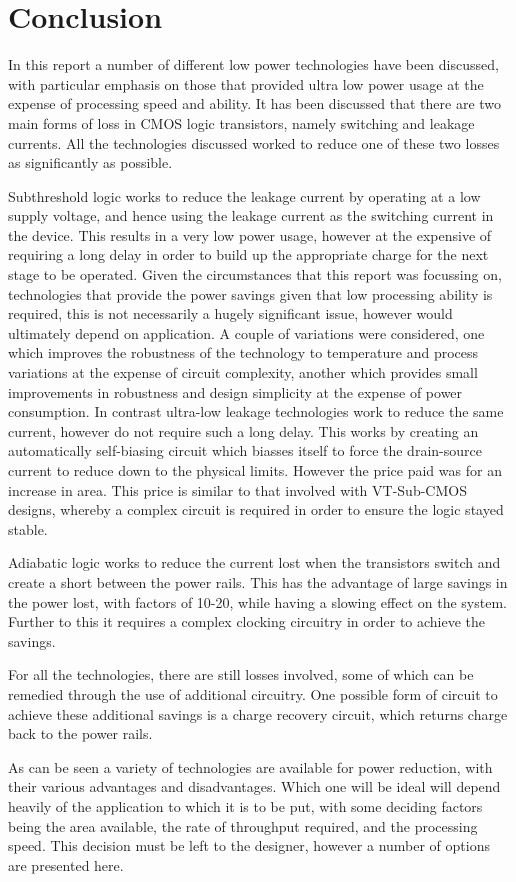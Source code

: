 \section{Conclusion}

In this report a number of different low power technologies have been discussed, with particular emphasis on those that provided ultra low power usage at the expense of processing speed and ability.
It has been discussed that there are two main forms of loss in CMOS logic transistors, namely switching and leakage currents.
All the technologies discussed worked to reduce one of these two losses as significantly as possible. 

Subthreshold logic works to reduce the leakage current by operating at a low supply voltage, and hence using the leakage current as the switching current in the device.
This results in a very low power usage, however at the expensive of requiring a long delay in order to build up the appropriate charge for the next stage to be operated.
Given the circumstances that this report was focussing on, technologies that provide the power savings given that low processing ability is required, this is not necessarily a hugely significant issue, however would ultimately depend on application.
A couple of variations were considered, one which improves the robustness of the technology to temperature and process variations at the expense of circuit complexity, another which provides small improvements in robustness and design simplicity at the expense of power consumption.
In contrast ultra-low leakage technologies work to reduce the same current, however do not require such a long delay.
This works by creating an automatically self-biasing circuit which biasses itself to force the drain-source current to reduce down to the physical limits.
However the price paid was for an increase in area.
This price is similar to that involved with VT-Sub-CMOS designs, whereby a complex circuit is required in order to ensure the logic stayed stable.

Adiabatic logic works to reduce the current lost when the transistors switch and create a short between the power rails.
This has the advantage of large savings in the power lost, with factors of 10-20, while having a slowing effect on the system.
Further to this it requires a complex clocking circuitry in order to achieve the savings.

For all the technologies, there are still losses involved, some of which can be remedied through the use of additional circuitry.
One possible form of circuit to achieve these additional savings is a charge recovery circuit, which returns charge back to the power rails.

As can be seen a variety of technologies are available for power reduction, with their various advantages and disadvantages.
Which one will be ideal will depend heavily of the application to which it is to be put, with some deciding factors being the area available, the rate of throughput required, and the processing speed.
This decision must be left to the designer, however a number of options are presented here.
